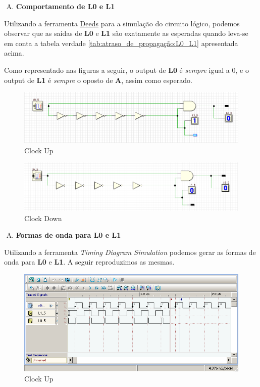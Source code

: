 \documentclass[12pt]{article}
\begin{document}
\begin{enumerate}[B)]
\item \textbf{Comportamento de L0 e L1}
\end{enumerate}

Utilizando a ferramenta
\href{https://www.digitalelectronicsdeeds.com/deeds.html}{Deeds} para a
simulação do circuito lógico, podemos observar que as saídas de \textbf{L0} e
\textbf{L1} são exatamente as esperadas quando leva-se em conta a tabela verdade
\ref{tab:atraso_de_propagação:L0_L1} apresentada acima.

Como representado nas figuras a seguir, o output de \textbf{L0} é \emph{sempre}
igual a $0$, e o output de \textbf{L1} é \emph{sempre} o oposto de \textbf{A},
assim como esperado.

\begin{figure}[H]
    \centering
    \includegraphics[width=.9\textwidth]{Exp04/exp4_2.0_b_clk_up.png}
    \caption{Clock Up}\label{fig:exp4_2.0_b_clk_up.png}
\end{figure}

\begin{figure}[H]
    \centering
    \includegraphics[width=.9\textwidth]{Exp04/exp4_2.0_b_clk_down.png}
    \caption{Clock Down}\label{fig:exp4_2.0_b_clk_down.png}
\end{figure}

\begin{enumerate}[C)]
\item \textbf{Formas de onda para L0 e L1}
\end{enumerate}

Utilizando a ferramenta \emph{Timing Diagram Simulation} podemos gerar as
formas de onda para \textbf{L0} e \textbf{L1}. A seguir reproduzimos as mesmas.

\begin{figure}[H]
    \centering
    \includegraphics[width=1\textwidth]{Exp04/exp4_2.0_c_clk_wave.png}
    \caption{Clock Up}\label{fig:exp4_2.0_c_clk_wave.png}
\end{figure}
\end{document}
